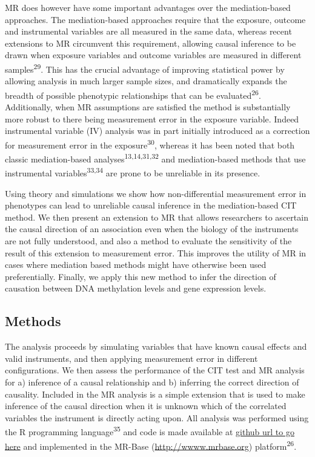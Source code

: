 \documentclass[]{article}
\begin{document}
MR does however have some important advantages over the mediation-based
approaches. The mediation-based approaches require that the exposure,
outcome and instrumental variables are all measured in the same data,
whereas recent extensions to MR circumvent this requirement, allowing
causal inference to be drawn when exposure variables and outcome
variables are measured in different samples\textsuperscript{29}. This
has the crucial advantage of improving statistical power by allowing
analysis in much larger sample sizes, and dramatically expands the
breadth of possible phenotypic relationships that can be
evaluated\textsuperscript{26}. Additionally, when MR assumptions are
satisfied the method is substantially more robust to there being
measurement error in the exposure variable. Indeed instrumental variable
(IV) analysis was in part initially introduced as a correction for
measurement error in the exposure\textsuperscript{30}, whereas it has
been noted that both classic mediation-based
analyses\textsuperscript{13,14,31,32} and mediation-based methods that
use instrumental variables\textsuperscript{33,34} are prone to be
unreliable in its presence.

Using theory and simulations we show how non-differential measurement
error in phenotypes can lead to unreliable causal inference in the
mediation-based CIT method. We then present an extension to MR that
allows researchers to ascertain the causal direction of an association
even when the biology of the instruments are not fully understood, and
also a method to evaluate the sensitivity of the result of this
extension to measurement error. This improves the utility of MR in cases
where mediation based methods might have otherwise been used
preferentially. Finally, we apply this new method to infer the direction
of causation between DNA methylation levels and gene expression levels.

\subsection{Methods}\label{methods}

The analysis proceeds by simulating variables that have known causal
effects and valid instruments, and then applying measurement error in
different configurations. We then assess the performance of the CIT test
and MR analysis for a) inference of a causal relationship and b)
inferring the correct direction of causality. Included in the MR
analysis is a simple extension that is used to make inference of the
causal direction when it is unknown which of the correlated variables
the instrument is directly acting upon. All analysis was performed using
the R programming language\textsuperscript{35} and code is made
available at \href{}{github url to go here} and implemented in the
MR-Base (\url{http://wwww.mrbase.org}) platform\textsuperscript{26}.
\end{document}
